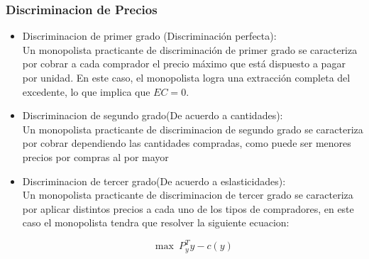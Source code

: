 \documentclass[11pt]{article}
\begin{document}
\subsubsection{Discriminacion de Precios}

\begin{itemize}
    \item Discriminacion de primer grado (Discriminación perfecta):\\
    Un monopolista practicante de discriminación de primer grado se caracteriza por cobrar a cada comprador el precio máximo que está dispuesto a pagar por unidad. En este caso, el monopolista logra una extracción completa del excedente, lo que implica que $EC=0$.
    \item Discriminacion de segundo grado(De acuerdo a cantidades):\\
    Un monopolista practicante de discriminacion de segundo grado se caracteriza por cobrar dependiendo las cantidades compradas, como puede ser menores precios por compras al por mayor
    \item Discriminacion de tercer grado(De acuerdo a eslasticidades):\\
    Un monopolista practicante de discriminacion de tercer grado se caracteriza por aplicar distintos precios a cada uno de los tipos de compradores, en este caso el monopolista tendra que resolver la siguiente ecuacion:

    $$\max~P^T_yy-c(y)$$


\end{itemize}
\end{document}
